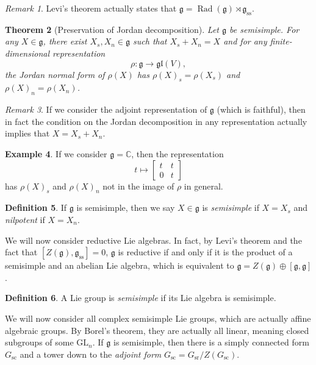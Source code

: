 \documentclass{amsart}
\newtheorem{thm}{Theorem}[section]
\theoremstyle{definition}
\newtheorem{defn}[thm]{Definition}
\newtheorem{exm}[thm]{Example}
\theoremstyle{remark}
\newtheorem{rmk}[thm]{Remark}
\theoremstyle{plain}
\theoremstyle{definition}
\theoremstyle{remark}
\newcommand{\C}{\mathbb{C}}
\newcommand{\g}{\mathfrak{g}}
\newcommand{\mf}[1]{\mathfrak{#1}}
\newcommand{\mr}[1]{\mathrm{#1}}
\newcommand{\on}[1]{\operatorname{#1}}
\newcommand{\1}{\mathbf{1}}
\newcommand{\2}{\mathbf{2}}
\newcommand{\3}{\mathbf{3}}
\newcommand{\GL}{\mr{GL}}
\newcommand{\gl}{\mf{gl}}
\begin{document}
\begin{rmk}
    Levi's theorem actually states that \(\g = \on{Rad}(\g) \rtimes \g_{\mr{ss}}\).
\end{rmk}

\begin{thm}[Preservation of Jordan decomposition]
    Let \(\g\) be semisimple. For any \(X \in \g\), there exist \(X_s, X_n \in \g\) such that \(X_s + X_n = X\) and for any finite-dimensional representation
    \[ \rho \colon \g \to \gl(V), \]
    the Jordan normal form of \(\rho(X)\) has \({\rho(X)}_s = \rho(X_s)\) and \({\rho(X)}_n = \rho(X_n)\).
\end{thm}

\begin{rmk}
    If we consider the adjoint representation of \(\g\) (which is faithful), then in fact the condition on the Jordan decomposition in any representation actually implies that \(X = X_s + X_n\).
\end{rmk}

\begin{exm}
    If we consider \(\g = \C\), then the representation
    \[ t \mapsto \begin{bmatrix}
        t & t \\
        0 & t
    \end{bmatrix} \]
    has \({\rho(X)}_s\) and \({\rho(X)}_n\) not in the image of \(\rho\) in general.
\end{exm}

\begin{defn}
    If \(\g\) is semisimple, then we say \(X \in \g\) is \textit{semisimple} if \(X = X_s\) and \textit{nilpotent} if \(X = X_n\).
\end{defn}


We will now consider reductive Lie algebras. In fact, by Levi's theorem and the fact that \([Z(\g), \g_{\mr{ss}}] = 0\), \(\g\) is reductive if and only if it is the product of a semisimple and an abelian Lie algebra, which is equivalent to \(\g = Z(\g) \oplus [\g, \g]\).

\begin{defn}
    A Lie group is \textit{semisimple} if its Lie algebra is semisimple.
\end{defn}

We will now consider all complex semisimple Lie groups, which are actually affine algebraic groups. By Borel's theorem, they are actually all linear, meaning closed subgroups of some \(\GL_n\). If \(\g\) is semisimple, then there is a simply connected form \(G_{\on{sc}}\) and a tower down to the \textit{adjoint form} \(G_{\mr{sc}} = G_{\mr{sr}} / Z(G_{\mr{sc}})\).
\end{document}
